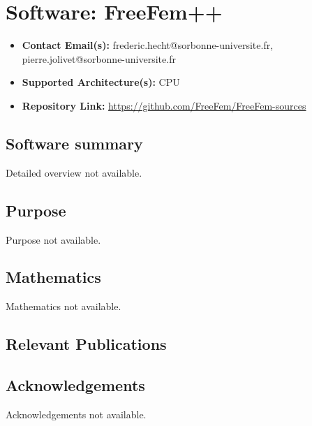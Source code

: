 \section{Software: FreeFem++}
\label{sec:FreeFem++:software}



\begin{itemize}
    \item \textbf{Contact Email(s):} frederic.hecht@sorbonne-universite.fr, pierre.jolivet@sorbonne-universite.fr
    \item \textbf{Supported Architecture(s):} CPU
    \item \textbf{Repository Link:} \href{https://github.com/FreeFem/FreeFem-sources}{https://github.com/FreeFem/FreeFem-sources}
\end{itemize}

\subsection{Software summary}
\label{sec:FreeFem++:summary}
Detailed overview not available.



\subsection{Purpose}
\label{sec:FreeFem++:purpose}
Purpose not available.



\subsection{Mathematics}
\label{sec:FreeFem++:mathematics}
Mathematics not available.


\subsection{Relevant Publications}
\label{sec:FreeFem++:publications}

\subsection{Acknowledgements}
\label{sec::FreeFem++:acknowledgements}

Acknowledgements not available.



